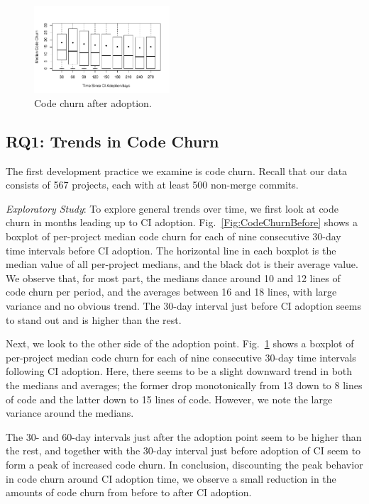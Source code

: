 \begin{figure}[t]
\centering
\includegraphics[width=0.45\textwidth, clip=true, trim=0 15 15 50]{churn_after.pdf}
\caption{Code churn after \Tvis adoption.}
\label{Fig:CodeChurnAfter}
\end{figure}


\subsection{RQ1: Trends in Code Churn}

The first development practice we examine is code churn.
Recall that our data consists of 567 projects, each with at least 500 non-merge 
commits.

\smallskip\noindent \emph{Exploratory Study}: To explore general trends over 
time, we first look at code churn in months leading up to CI adoption.
Fig.~\ref{Fig:CodeChurnBefore} shows a boxplot of per-project median code 
churn for each of nine consecutive 30-day time intervals before CI adoption.
The horizontal line in each boxplot is the median value of all per-project medians, 
and the black dot is their average value.
We observe that, for most part, the medians dance around 10 and 12 lines of 
code churn per period, and the averages between 16 and 18 lines, with large 
variance and no obvious trend. 
The 30-day interval just before CI adoption seems to stand out and is higher 
than the rest.

Next, we look to the other side of the adoption point. 
Fig.~\ref{Fig:CodeChurnAfter} shows a boxplot of per-project median code 
churn for each of nine consecutive 30-day time intervals following CI adoption.
Here, there seems to be a slight downward trend in both the medians and 
averages; the former drop monotonically from 13 down to 8 lines of code and 
the latter down to 15 lines of code.
However, we note the large variance around the medians.

The 30- and 60-day intervals just after the adoption point seem to be higher 
than the rest, and together with the 30-day interval just before adoption of CI 
seem to form a peak of increased code churn.
In conclusion, discounting the peak behavior in code churn around CI adoption 
time, we observe a small reduction in the amounts of code churn from before 
to after CI adoption.

